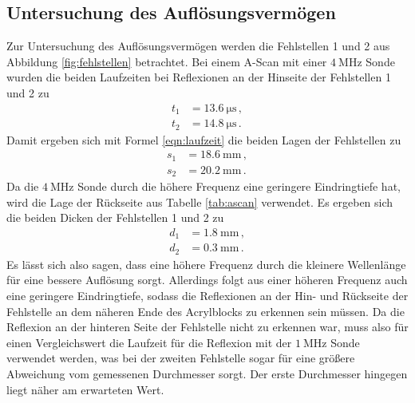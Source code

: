 \subsection{Untersuchung des Auflösungsvermögen}
Zur Untersuchung des Auflösungsvermögen werden die Fehlstellen 1 und 2 aus Abbildung
\ref{fig:fehlstellen} betrachtet.
Bei einem A-Scan mit einer $\SI{4}{\mega\hertz}$ Sonde wurden die beiden Laufzeiten bei
Reflexionen an der Hinseite der Fehlstellen 1 und 2 zu
\begin{align*}
	t_1 &= \SI{13.6}{\micro\second} \, \mathrm{,} \\
	t_2 &= \SI{14.8}{\micro\second} \, \mathrm{.}
\end{align*}
Damit ergeben sich mit Formel \eqref{eqn:laufzeit} die beiden Lagen der Fehlstellen zu
\begin{align*}
	s_1 &= \SI{18.6}{\milli\meter} \, \mathrm{,} \\
	s_2 &= \SI{20.2}{\milli\meter} \, \mathrm{.}
\end{align*}
Da die $\SI{4}{\mega\hertz}$ Sonde durch die höhere Frequenz eine geringere Eindringtiefe
hat, wird die Lage der Rückseite aus Tabelle \ref{tab:ascan} verwendet.
Es ergeben sich die beiden Dicken der Fehlstellen 1 und 2 zu
\begin{align*}
	d_1 &= \SI{1.8}{\milli\meter} \, \mathrm{,} \\
	d_2 &= \SI{0.3}{\milli\meter} \, \mathrm{.}
\end{align*}
Es lässt sich also sagen, dass eine höhere Frequenz durch die kleinere Wellenlänge
für eine bessere Auflösung sorgt.
Allerdings folgt aus einer höheren Frequenz auch eine geringere Eindringtiefe, sodass die
Reflexionen an der Hin- und Rückseite der Fehlstelle an dem näheren Ende des Acrylblocks zu
erkennen sein müssen.
Da die Reflexion an der hinteren Seite der Fehlstelle nicht zu erkennen war, muss also für
einen Vergleichswert die Laufzeit für die Reflexion mit der $\SI{1}{\mega\hertz}$ Sonde
verwendet werden, was bei der zweiten Fehlstelle sogar für eine größere Abweichung vom gemessenen
Durchmesser sorgt. Der erste Durchmesser hingegen liegt näher am erwarteten Wert.


